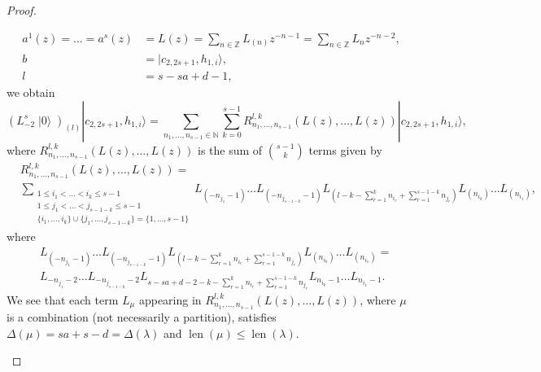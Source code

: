 \documentclass[a4paper, 12pt, reqno]{amsart}
\theoremstyle{remark}
\DeclareMathOperator{\len}{len}
\DeclareMathOperator{\vac}{|0\rangle}
\begin{document}
\begin{proof}
\begin{enumerate}
    \begin{align*}
      a^1(z) = \dots = a^s(z) &= L(z) = \sum_{n \in \mathbb{Z}}L_{(n)}z^{-n - 1} = \sum_{n \in \mathbb{Z}}L_nz^{-n - 2}, \\
      b &= |c_{2, 2s + 1}, h_{1, i}\rangle, \\
      l &= s - sa + d - 1,
    \end{align*}
    we obtain
    \begin{equation}
      \label{eq:6}
      (L_{-2}^s\vac)_{(l)}|c_{2, 2s + 1}, h_{1, i}\rangle = \sum_{n_1, \dots, n_{s - 1} \in \mathbb{N}}\sum_{k = 0}^{s - 1}R^{l, k}_{n_1, \dots, n_{s - 1}}(L(z), \dots, L(z))|c_{2, 2s + 1}, h_{1, i}\rangle,
    \end{equation}
    where $R^{l, k}_{n_1, \dots, n_{s - 1}}(L(z), \dots, L(z))$ is the sum of $\binom{s - 1}{k}$ terms given by
    \begin{align*}
      &R^{l, k}_{n_1, \dots, n_{s - 1}}(L(z), \dots, L(z)) = \\
      &\sum_{\substack{1 \le i_1 < \dots < i_k \le s - 1 \\ 1 \le j_1 < \dots < j_{s - 1 - k} \le s - 1 \\ \{i_1, \dots, i_k\} \cup \{j_1, \dots, j_{s - 1 - k}\} = \{1, \dots, s - 1\}}}L_{(-n_{j_1} - 1)}\dots L_{(-n_{j_{s - 1 - k}} - 1)}L_{(l - k - \sum_{r = 1}^kn_{i_r} + \sum_{r = 1}^{s - 1 - k}n_{j_r})}L_{(n_{i_k})}\dots L_{(n_{i_1})},
    \end{align*}
    where
    \begin{align*}
      &L_{(-n_{j_1} - 1)}\dots L_{(-n_{j_{s - 1 - k}} - 1)}L_{(l - k - \sum_{r = 1}^kn_{i_r} + \sum_{r = 1}^{s - 1 - k}n_{j_r})}L_{(n_{i_k})}\dots L_{(n_{i_1})} = \\
      &L_{-n_{j_1} - 2}\dots L_{-n_{j_{s - 1 - k}} - 2}L_{s - sa + d - 2 - k - \sum_{r = 1}^kn_{i_r} + \sum_{r = 1}^{s - 1 - k}n_{j_r}}L_{n_{i_k} - 1}\dots L_{n_{i_1} - 1}.
    \end{align*}
    We see that each term $L_{\mu}$ appearing in $R^{l, k}_{n_1, \dots, n_{s - 1}}(L(z), \dots, L(z))$, where $\mu$ is a combination (not necessarily a partition), satisfies $\Delta(\mu) = sa + s - d = \Delta(\lambda)$ and $\len(\mu) \le \len(\lambda)$.


\end{enumerate}
\end{proof}
\end{document}
